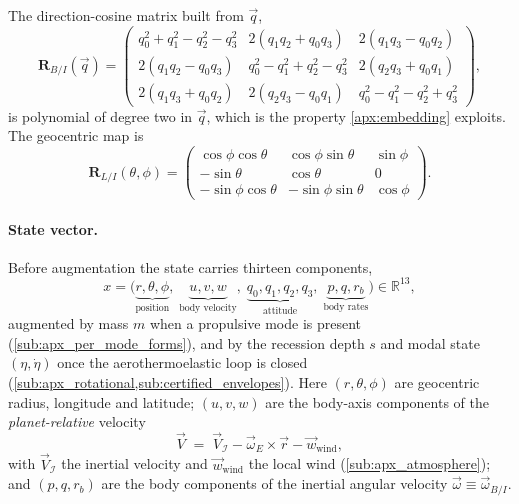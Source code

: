 The
direction-cosine matrix built from $\vec q$,
\begin{equation}
\label{eq:apx_dcm}
\mathbf R_{B/I}(\vec q)=
\begin{pmatrix}
q_0^2+q_1^2-q_2^2-q_3^2 & 2(q_1q_2+q_0q_3) & 2(q_1q_3-q_0q_2)\\
2(q_1q_2-q_0q_3) & q_0^2-q_1^2+q_2^2-q_3^2 & 2(q_2q_3+q_0q_1)\\
2(q_1q_3+q_0q_2) & 2(q_2q_3-q_0q_1) & q_0^2-q_1^2-q_2^2+q_3^2
\end{pmatrix},
\end{equation}
is polynomial of degree two in $\vec q$, which is the property
\cref{apx:embedding} exploits. The geocentric map is
\begin{equation}
\label{eq:apx_RLI}
\mathbf R_{L/I}(\theta,\phi)=
\begin{pmatrix}
\cos\phi\cos\theta & \cos\phi\sin\theta & \sin\phi\\
-\sin\theta & \cos\theta & 0\\
-\sin\phi\cos\theta & -\sin\phi\sin\theta & \cos\phi
\end{pmatrix}.
\end{equation}

\paragraph{State vector.} Before augmentation the state carries thirteen
components,
\begin{equation}
\label{eq:apx_state}
x=\bigl(\underbrace{r,\theta,\phi}_{\text{position}},\;
        \underbrace{u,v,w}_{\text{body velocity}},\;
        \underbrace{q_0,q_1,q_2,q_3}_{\text{attitude}},\;
        \underbrace{p,q,r_{\!b}}_{\text{body rates}}\bigr)\in\mathbb R^{13},
\end{equation}
augmented by mass $m$ when a propulsive mode is present
(\cref{sub:apx_per_mode_forms}), and by the recession depth $s$ and modal
state $(\eta,\dot\eta)$ once the aerothermoelastic loop is closed
(\cref{sub:apx_rotational,sub:certified_envelopes}). Here $(r,\theta,\phi)$
are geocentric radius, longitude and latitude; $(u,v,w)$ are the body-axis
components of the \emph{planet-relative} velocity
\begin{equation}
\label{eq:apx_relvel}
\vec V \;=\; \vec V_{\mathcal I} - \vec\omega_E\times\vec r - \vec w_{\mathrm{wind}},
\end{equation}
with $\vec V_{\mathcal I}$ the inertial velocity and $\vec w_{\mathrm{wind}}$
the local wind (\cref{sub:apx_atmosphere}); and $(p,q,r_{\!b})$ are the body
components of the inertial angular velocity $\vec\omega\equiv\vec\omega_{B/I}$.

